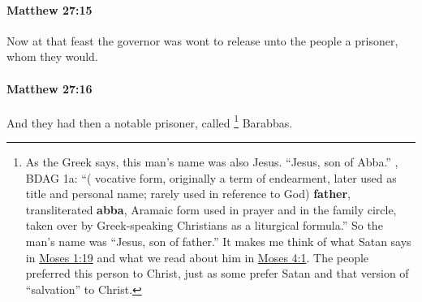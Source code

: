 		\paragraph{Matthew 27:15} %
			\label{MATTHEW-27-15}

			Now at that feast the governor was wont to release unto the people a prisoner, whom they would.

			\begin{framed}
			\scriptsize
				\begin{compactdesc}
					\item[SBLG] 
				\end{compactdesc}
			\end{framed}

		\paragraph{Matthew 27:16} %
			\label{MATTHEW-27-16}

			And they had then a notable prisoner, called
				\footnote{%
					As the Greek says, this man's name was also Jesus. ``Jesus, son of Abba.'' , BDAG 1a: ``( vocative form, originally a term of endearment, later used as title and personal name; rarely used in reference to God) \textbf{father}, transliterated \textbf{abba}, Aramaic form used in prayer and in the family circle, taken over by Greek-speaking Christians as a liturgical formula.'' So the man's name was ``Jesus, son of father.'' It makes me think of what Satan says in \hyperref[MOSES-1-19]{Moses 1:19} and what we read about him in \hyperref[MOSES-4-1]{Moses 4:1}. The people preferred this person to Christ, just as some prefer Satan and that version of ``salvation'' to Christ.
					}%
			Barabbas.

